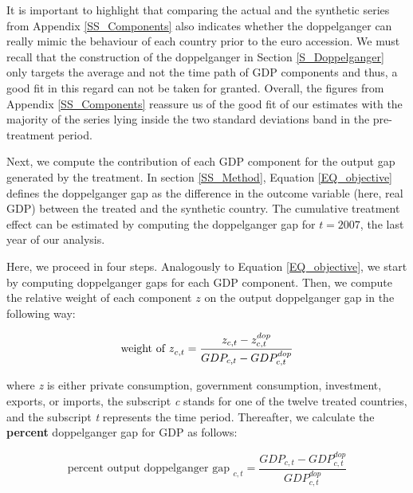 \documentclass[12pt]{article}
\renewcommand{\vec}[1]{\mathbf{#1}}
\begin{document}
It is important to highlight that comparing the actual and the synthetic series from Appendix \ref{SS_Components} also indicates whether the doppelganger can really mimic the behaviour of each country prior to the euro accession. We must recall that the construction of the doppelganger in Section \ref{S_Doppelganger} only targets the average and not the time path of GDP components and thus, a good fit in this regard can not be taken for granted. Overall, the figures from Appendix \ref{SS_Components} reassure us of the good fit of our estimates with the majority of the series lying inside the two standard deviations band in the pre-treatment period. 


Next, we compute the contribution of each GDP component for the output gap generated by the treatment. In section \ref{SS_Method}, Equation \ref{EQ_objective} defines the doppelganger gap as the difference in the outcome variable (here, real GDP) between the treated and the synthetic country. The cumulative treatment effect can be estimated by computing the doppelganger gap for $t=2007$, the last year of our analysis.

Here, we proceed in four steps. Analogously to Equation \ref{EQ_objective}, we start by computing doppelganger gaps for each GDP component. Then, we compute the relative weight of each component $z$ on the output doppelganger gap in the following way:

\begin{equation}
\label{equation2}
\text{weight of \textit{z}}_{c,t}= \frac{z_{c,t} - z_{c,t}^{dop}}{GDP_{c,t} - GDP_{c,t}^{dop}}
\end{equation}

where \textit{z} is either private consumption, government consumption, investment, exports, or imports, the subscript \textit{c} stands for one of the twelve treated countries, and the subscript \textit{t} represents the time period. Thereafter, we calculate the \textbf{percent} doppelganger gap for GDP as follows:

\begin{equation}
\label{equation3}
\text{percent output doppelganger gap }_{c,t}= \frac{GDP_{c,t}-GDP_{c,t}^{dop}}{GDP_{c,t}^{dop}}
\end{equation}
\end{document}
